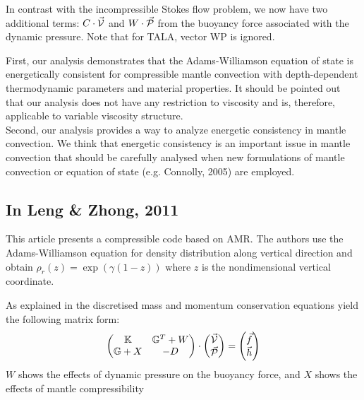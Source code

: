 \documentclass[a4paper,11pt]{article}
\newcommand{\K}{{\mathbb{K}}}
\newcommand{\G}{{\mathbb{G}}}
\begin{document}
In contrast with the incompressible Stokes flow problem, we now have two 
additional terms: $C \cdot \vec{\cal V}$ 
and $W\cdot \vec{\cal P}$ from the buoyancy force associated with the dynamic pressure.
Note that for TALA, vector WP is ignored.



\begin{displayquote}
{\color{darkgray}
First, our analysis demonstrates that the Adams-Williamson equation of state is 
energetically consistent for compressible mantle convection with depth-dependent
thermodynamic parameters and material properties. It should be pointed out that 
our analysis does not have any restriction to viscosity and is,
therefore, applicable to variable viscosity structure. \\
Second, our analysis provides a way to analyze energetic consistency in mantle convection.
We think that energetic consistency is an important issue in mantle convection 
that should be carefully analysed when new formulations of
mantle convection or equation of state (e.g. Connolly, 2005) are employed.}
\end{displayquote}






\subsection{In Leng \& Zhong, 2011 \cite{lezh11}}

This article presents a compressible code based on AMR.
The authors use the Adams-Williamson equation for density
distribution along vertical direction and obtain $\rho_r(z)=\exp(\gamma (1-z))$
where $z$ is the nondimensional vertical coordinate.


As explained in \cite{lezh11} the discretised mass and momentum conservation
equations yield the following matrix form:
\[
\begin{pmatrix}
\K & \G^T + W  \\
\G + X & -D
\end{pmatrix}
\cdot
\begin{pmatrix}
\vec{\cal V} \\
\vec{\cal P}
\end{pmatrix}
=
\begin{pmatrix}
\vec{f} \\
\vec{h}
\end{pmatrix}
\]
$W$ shows the
effects of dynamic pressure on the buoyancy force,
and $X$ shows the effects of mantle compressibility
\end{document}
